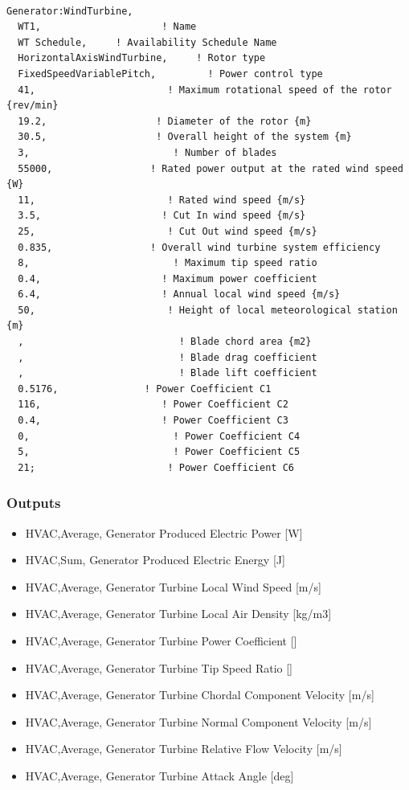 \begin{lstlisting}

Generator:WindTurbine,
  WT1,                     ! Name
  WT Schedule,     ! Availability Schedule Name
  HorizontalAxisWindTurbine,     ! Rotor type
  FixedSpeedVariablePitch,         ! Power control type
  41,                       ! Maximum rotational speed of the rotor {rev/min}
  19.2,                   ! Diameter of the rotor {m}
  30.5,                   ! Overall height of the system {m}
  3,                         ! Number of blades
  55000,                 ! Rated power output at the rated wind speed {W}
  11,                       ! Rated wind speed {m/s}
  3.5,                     ! Cut In wind speed {m/s}
  25,                       ! Cut Out wind speed {m/s}
  0.835,                 ! Overall wind turbine system efficiency
  8,                         ! Maximum tip speed ratio
  0.4,                     ! Maximum power coefficient
  6.4,                     ! Annual local wind speed {m/s}
  50,                       ! Height of local meteorological station {m}
  ,                           ! Blade chord area {m2}
  ,                           ! Blade drag coefficient
  ,                           ! Blade lift coefficient
  0.5176,               ! Power Coefficient C1
  116,                     ! Power Coefficient C2
  0.4,                     ! Power Coefficient C3
  0,                         ! Power Coefficient C4
  5,                         ! Power Coefficient C5
  21;                       ! Power Coefficient C6
\end{lstlisting}

\subsubsection{Outputs}\label{outputs-12-001}

\begin{itemize}
\item
  HVAC,Average, Generator Produced Electric Power {[}W{]}
\item
  HVAC,Sum, Generator Produced Electric Energy {[}J{]}
\item
  HVAC,Average, Generator Turbine Local Wind Speed {[}m/s{]}
\item
  HVAC,Average, Generator Turbine Local Air Density {[}kg/m3{]}
\item
  HVAC,Average, Generator Turbine Power Coefficient {[]}
\item
  HVAC,Average, Generator Turbine Tip Speed Ratio {[]}
\item
  HVAC,Average, Generator Turbine Chordal Component Velocity {[}m/s{]}
\item
  HVAC,Average, Generator Turbine Normal Component Velocity {[}m/s{]}
\item
  HVAC,Average, Generator Turbine Relative Flow Velocity {[}m/s{]}
\item
  HVAC,Average, Generator Turbine Attack Angle {[}deg{]}
\end{itemize}

